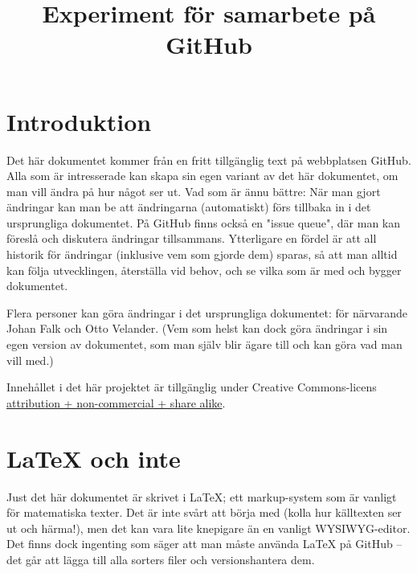 \documentclass[12pt]{article}
\title{Experiment för samarbete på GitHub}
\date{}
\begin{document}
  \maketitle
  
  \section{Introduktion}
  Det här dokumentet kommer från en fritt tillgänglig text på webbplatsen GitHub.
  Alla som är intresserade kan skapa sin egen variant av det här dokumentet, om man vill ändra på hur något ser ut.
  Vad som är ännu bättre: När man gjort ändringar kan man be att ändringarna (automatiskt) förs tillbaka in i det ursprungliga dokumentet.
  På GitHub finns också en "issue queue", där man kan föreslå och diskutera ändringar tillsammans.
  Ytterligare en fördel är att all historik för ändringar (inklusive vem som gjorde dem) sparas, så att man alltid kan följa utvecklingen, återställa vid behov, och se vilka som är med och bygger dokumentet.
  
  Flera personer kan göra ändringar i det ursprungliga dokumentet: för närvarande Johan Falk och Otto Velander.
  (Vem som helst kan dock göra ändringar i sin egen version av dokumentet, som man själv blir ägare till och kan göra vad man vill med.)
  
  Innehållet i det här projektet är tillgänglig under Creative Commons-licens \href{http://creativecommons.org/licenses/by-nc-sa/3.0/}{attribution + non-commercial + share alike}.

  \section{LaTeX och inte}
  Just det här dokumentet är skrivet i LaTeX; ett markup-system som är vanligt för matematiska texter.
  Det är inte svårt att börja med (kolla hur källtexten ser ut och härma!), men det kan vara lite knepigare än en vanligt WYSIWYG-editor.
  Det finns dock ingenting som säger att man måste använda LaTeX på GitHub -- det går att lägga till alla sorters filer och versionshantera dem.

  
  
  
\end{document}
